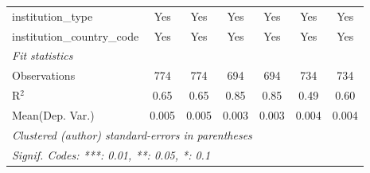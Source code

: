 \begin{tabular}{lcccccc}
   institution\_type                  & Yes     & Yes     & Yes     & Yes      & Yes       & Yes\\  
   institution\_country\_code         & Yes     & Yes     & Yes     & Yes      & Yes       & Yes\\  
   \midrule
   \emph{Fit statistics}\\
   Observations                       & 774     & 774     & 694     & 694      & 734       & 734\\  
   R$^2$                              & 0.65    & 0.65    & 0.85    & 0.85     & 0.49      & 0.60\\  
Mean(Dep. Var.) & 0.005 & 0.005 & 0.003 & 0.003 & 0.004 & 0.004 \\
   \midrule \midrule
   \multicolumn{7}{l}{\emph{Clustered (author) standard-errors in parentheses}}\\
   \multicolumn{7}{l}{\emph{Signif. Codes: ***: 0.01, **: 0.05, *: 0.1}}\\
\end{tabular}
\par\endgroup

